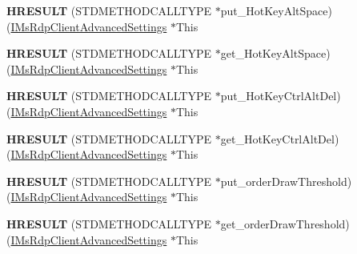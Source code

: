 \begin{DoxyCompactItemize}
{\bfseries H\+R\+E\+S\+U\+LT} (S\+T\+D\+M\+E\+T\+H\+O\+D\+C\+A\+L\+L\+T\+Y\+PE $\ast$put\+\_\+\+Hot\+Key\+Alt\+Space)(\hyperlink{interface_m_s_t_s_c_lib_1_1_i_ms_rdp_client_advanced_settings}{I\+Ms\+Rdp\+Client\+Advanced\+Settings} $\ast$This
\item 
\mbox{\label{struct_m_s_t_s_c_lib_1_1_i_ms_rdp_client_advanced_settings_vtbl_ae464c718fb7c6c8999f7e64a8b4fe144}} 
{\bfseries H\+R\+E\+S\+U\+LT} (S\+T\+D\+M\+E\+T\+H\+O\+D\+C\+A\+L\+L\+T\+Y\+PE $\ast$get\+\_\+\+Hot\+Key\+Alt\+Space)(\hyperlink{interface_m_s_t_s_c_lib_1_1_i_ms_rdp_client_advanced_settings}{I\+Ms\+Rdp\+Client\+Advanced\+Settings} $\ast$This
\item 
\mbox{\label{struct_m_s_t_s_c_lib_1_1_i_ms_rdp_client_advanced_settings_vtbl_a9bf3cebc4648f79bfd5c35389d732d1d}} 
{\bfseries H\+R\+E\+S\+U\+LT} (S\+T\+D\+M\+E\+T\+H\+O\+D\+C\+A\+L\+L\+T\+Y\+PE $\ast$put\+\_\+\+Hot\+Key\+Ctrl\+Alt\+Del)(\hyperlink{interface_m_s_t_s_c_lib_1_1_i_ms_rdp_client_advanced_settings}{I\+Ms\+Rdp\+Client\+Advanced\+Settings} $\ast$This
\item 
\mbox{\label{struct_m_s_t_s_c_lib_1_1_i_ms_rdp_client_advanced_settings_vtbl_ac049646d9aecba90a9c60e5b31c96c29}} 
{\bfseries H\+R\+E\+S\+U\+LT} (S\+T\+D\+M\+E\+T\+H\+O\+D\+C\+A\+L\+L\+T\+Y\+PE $\ast$get\+\_\+\+Hot\+Key\+Ctrl\+Alt\+Del)(\hyperlink{interface_m_s_t_s_c_lib_1_1_i_ms_rdp_client_advanced_settings}{I\+Ms\+Rdp\+Client\+Advanced\+Settings} $\ast$This
\item 
\mbox{\label{struct_m_s_t_s_c_lib_1_1_i_ms_rdp_client_advanced_settings_vtbl_ae957a6e51e5ad505a89a7e42a37be140}} 
{\bfseries H\+R\+E\+S\+U\+LT} (S\+T\+D\+M\+E\+T\+H\+O\+D\+C\+A\+L\+L\+T\+Y\+PE $\ast$put\+\_\+order\+Draw\+Threshold)(\hyperlink{interface_m_s_t_s_c_lib_1_1_i_ms_rdp_client_advanced_settings}{I\+Ms\+Rdp\+Client\+Advanced\+Settings} $\ast$This
\item 
\mbox{\label{struct_m_s_t_s_c_lib_1_1_i_ms_rdp_client_advanced_settings_vtbl_a650a2d09ae66353db4f02b5f504a2ee8}} 
{\bfseries H\+R\+E\+S\+U\+LT} (S\+T\+D\+M\+E\+T\+H\+O\+D\+C\+A\+L\+L\+T\+Y\+PE $\ast$get\+\_\+order\+Draw\+Threshold)(\hyperlink{interface_m_s_t_s_c_lib_1_1_i_ms_rdp_client_advanced_settings}{I\+Ms\+Rdp\+Client\+Advanced\+Settings} $\ast$This

\end{DoxyCompactItemize}
